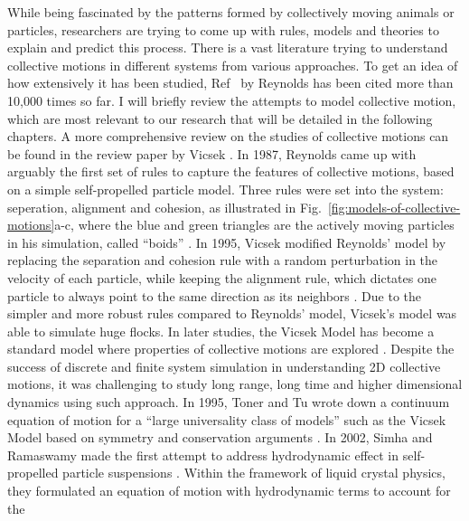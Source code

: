 While being fascinated by the patterns formed by collectively moving animals or particles, researchers are trying to come up with rules, models and theories to explain and predict this process. There is a vast literature trying to understand collective motions in different systems from various approaches. To get an idea of how extensively it has been studied, Ref~\cite{Reynolds1987} by Reynolds has been cited more than 10,000 times so far. I will briefly review the attempts to model collective motion, which are most relevant to our research that will be detailed in the following chapters. A more comprehensive review on the studies of collective motions can be found in the review paper by Vicsek \cite{Vicsek2012}. In 1987, Reynolds came up with arguably the first set of rules to capture the features of collective motions, based on a simple self-propelled particle model. Three rules were set into the system: seperation, alignment and cohesion, as illustrated in Fig.~\ref{fig:models-of-collective-motions}a-c, where the blue and green triangles are the actively moving particles in his simulation, called ``boids'' \cite{Reynolds1987}. In 1995, Vicsek modified Reynolds' model by replacing the separation and cohesion rule with a random perturbation in the velocity of each particle, while keeping the alignment rule, which dictates one particle to always point to the same direction as its neighbors \cite{Vicsek1995}. Due to the simpler and more robust rules compared to Reynolds' model, Vicsek's model was able to simulate huge flocks. In later studies, the Vicsek Model has become a standard model where properties of collective motions are explored
\cite{Gregoire2004, Chate2008, Ginelli2010, Ngo2014, Mahault2019}. Despite the success of discrete and finite system simulation in understanding 2D collective motions, it was challenging to study long range, long time and higher dimensional dynamics using such approach. In 1995, Toner and Tu wrote down a continuum equation of motion for a ``large universality class of models'' such as the Vicsek Model based on symmetry and conservation arguments \cite{Toner1995}. In 2002, Simha and Ramaswamy made the first attempt to address hydrodynamic effect in self-propelled particle suspensions \cite{Simha2002}. Within the framework of liquid crystal physics, they formulated an equation of motion with hydrodynamic terms to account for the
